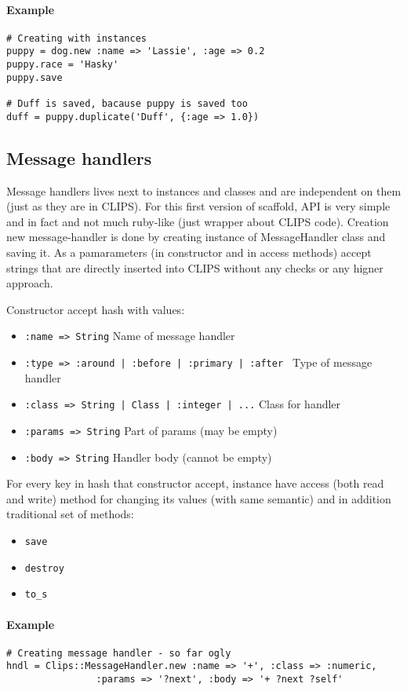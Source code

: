 \documentclass[a4paper,10pt]{article}
\begin{document}
\paragraph{Example}
\begin{verbatim}
# Creating with instances
puppy = dog.new :name => 'Lassie', :age => 0.2
puppy.race = 'Hasky'
puppy.save

# Duff is saved, bacause puppy is saved too
duff = puppy.duplicate('Duff', {:age => 1.0})
\end{verbatim}

\subsection{Message handlers}
Message handlers lives next to instances and classes and are independent on them (just as they are in CLIPS). For this first version of scaffold, API is very simple and in fact and not much ruby-like (just wrapper about CLIPS code). Creation new message-handler is done by creating instance of MessageHandler class and saving it. As a pamarameters (in constructor and in access methods) accept strings that are directly inserted into CLIPS without any checks or any higner approach.

Constructor accept hash with values:
\begin{itemize}
 \item \texttt{:name => String} Name of message handler
 \item \texttt{:type => :around | :before | :primary | :after } Type of message handler
 \item \texttt{:class => String | Class | :integer | ...} Class for handler
 \item \texttt{:params => String} Part of params (may be empty)
 \item \texttt{:body => String} Handler body (cannot be empty)
\end{itemize}

For every key in hash that constructor accept, instance have access (both read and write) method for changing its values (with same semantic) and in addition traditional set of methods:
\begin{itemize}
 \item \texttt{save}
 \item \texttt{destroy}
 \item \texttt{to\_s}
\end{itemize}

\paragraph{Example}
\begin{verbatim}
# Creating message handler - so far ogly
hndl = Clips::MessageHandler.new :name => '+', :class => :numeric,
                :params => '?next', :body => '+ ?next ?self'
\end{verbatim}
\end{document}
